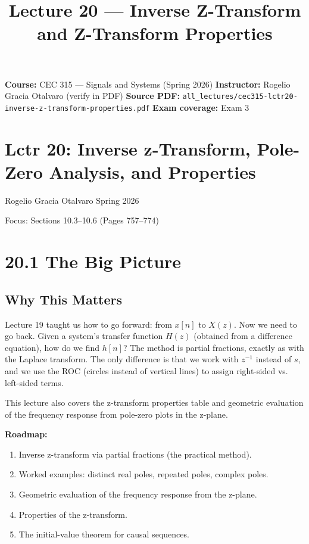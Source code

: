 \documentclass[11pt]{article}
\title{Lecture 20 — Inverse Z-Transform and Z-Transform Properties}
\author{}
\date{}
\begin{document}
\maketitle

\textbf{Course:} CEC 315 — Signals and Systems (Spring 2026)
\textbf{Instructor:} Rogelio Gracia Otalvaro (verify in PDF)
\textbf{Source PDF:} \texttt{all\_lectures/cec315-lctr20-inverse-z-transform-properties.pdf}
\textbf{Exam coverage:} Exam 3

\section*{Lctr 20: Inverse z-Transform, Pole-Zero Analysis, and Properties}

Rogelio Gracia Otalvaro
Spring 2026

Focus: Sections 10.3–10.6 (Pages 757–774)

\section*{20.1 The Big Picture}

\subsection*{Why This Matters}

Lecture 19 taught us how to go forward: from $x[n]$ to $X(z)$. Now we need to go back. Given a system's transfer function $H(z)$ (obtained from a difference equation), how do we find $h[n]$? The method is partial fractions, exactly as with the Laplace transform. The only difference is that we work with $z^{-1}$ instead of $s$, and we use the ROC (circles instead of vertical lines) to assign right-sided vs. left-sided terms.

This lecture also covers the z-transform properties table and geometric evaluation of the frequency response from pole-zero plots in the z-plane.

\textbf{Roadmap:}

\begin{enumerate}
  \item Inverse z-transform via partial fractions (the practical method).
  \item Worked examples: distinct real poles, repeated poles, complex poles.
  \item Geometric evaluation of the frequency response from the z-plane.
  \item Properties of the z-transform.
  \item The initial-value theorem for causal sequences.
\end{enumerate}
\end{document}
